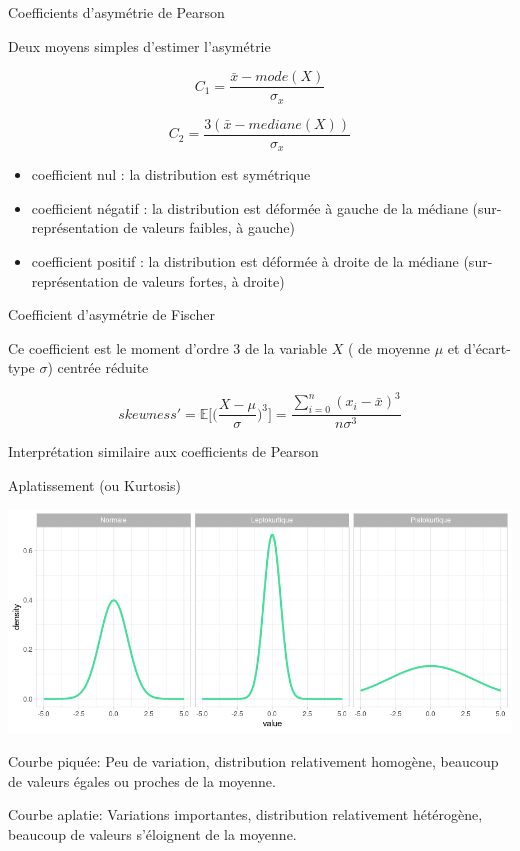 \documentclass{beamer}
\begin{document}
\begin{frame}{Coefficients d'asymétrie de Pearson}


Deux moyens simples d'estimer l'asymétrie 

$$ C_1 = \frac{\bar{x} - mode(X)}{\sigma_x}$$

$$ C_2 = \frac{3(\bar{x} - mediane(X))}{\sigma_x}$$


\begin{scriptsize}
\begin{itemize}
  \item coefficient \alert{nul} :  la distribution est \alert{symétrique}
  \item coefficient \alert{négatif} : la distribution est \alert{déformée à gauche} de la médiane (sur-représentation de valeurs faibles, à gauche)
  \item coefficient \alert{positif} :  la distribution est \alert{déformée à droite} de la médiane (sur-représentation de valeurs fortes, à droite)
\end{itemize}
\end{scriptsize}

\end{frame}


\begin{frame}{ Coefficient d'asymétrie de Fischer}


Ce coefficient est le moment  d'ordre 3  de la variable $X$ ( de moyenne $\mu$ et d'écart-type $\sigma$) \alert{centrée réduite}

$$skewness'=\mathbb{E}\bigg[\bigg(\frac{X-\mu}{\sigma}\bigg)^3\bigg]=\frac{\sum_{i=0}^{n} (x_i - \bar{x})^3}{n\sigma^3}$$


Interprétation similaire aux coefficients de Pearson  




\end{frame}




\begin{frame}{Aplatissement  (ou \alert{Kurtosis})}


\begin{center}
\includegraphics[width=\linewidth]{img/aplatissement.png}
\end{center}

\alert{Courbe piquée}: Peu de variation, distribution relativement homogène, beaucoup de valeurs égales ou proches de la moyenne.

\alert{Courbe aplatie}: Variations importantes, distribution relativement hétérogène, beaucoup de valeurs s’éloignent de la moyenne.

\end{frame}
\end{document}
